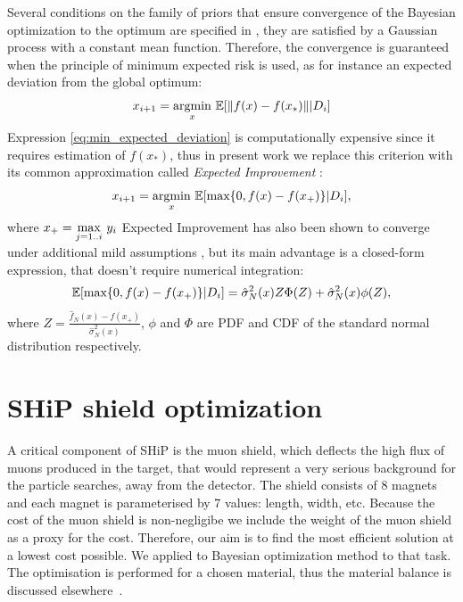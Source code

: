 \documentclass[a4paper]{jpconf}
\theoremstyle{my_theorem_style}
\numberwithin{equation}{section}
\begin{document}
Several conditions on the family of priors that ensure convergence of the Bayesian optimization to the optimum are specified in \cite{Mockus1994}, they are satisfied by a Gaussian process with a constant mean function. Therefore, the convergence is guaranteed when the principle of minimum expected risk is used, as for instance an expected deviation from the global optimum:
\begin{equation}
\label{eq:min_expected_deviation}
x_{i + 1} = \underset{x}{\textup{argmin}}\ \mathbb{E}[\|f(x) - f(x_*)\|  | D_i]
\end{equation}
Expression \ref{eq:min_expected_deviation} is computationally expensive since it requires estimation of $f(x_*)$, thus in present work we replace this criterion with its common approximation called \emph{Expected Improvement} \cite{Mockus1978}:
\begin{equation}
\label{EI}
x_{i + 1} = \underset{x}{\textup{argmin}}\ \mathbb{E}[\textup{max}\{0, f(x) - f(x_+)\}  | D_i],
\end{equation} 
where $x_+ = \underset{j = 1..i}{\textup{max}}\ y_i$
Expected Improvement has also been shown to converge under additional mild assumptions \cite{vazquez2010convergence}, but its main advantage is a closed-form expression, that doesn't require numerical integration:
\begin{equation}
\label{EI:closed_form}
\mathbb{E}[\textup{max}\{0, f(x) - f(x_+)\}  | D_i] = \hat{\sigma}_N^2(x) Z \Phi(Z) + \hat{\sigma}_N^2(x) \phi(Z),
\end{equation}
where $Z = \frac{\hat{f}_N(x) - f(x_+)}{\hat{\sigma}_N^2(x)}$, $\phi$ and $\Phi$ are PDF and CDF of the standard normal distribution respectively.


\section{SHiP shield optimization}

A critical component of SHiP is the muon shield, which deflects the high flux of muons produced in the target, that would represent a very serious  background for the particle searches, away from the detector. The shield consists of 8 magnets and each magnet is parameterised by 7 values: length, width, etc. Because the cost of the muon shield is non-negligibe we include the weight of the muon shield as a proxy for the cost. Therefore, our aim is to find the most efficient solution at a lowest cost possible. We applied to Bayesian optimization method to that task. The optimisation is performed for a chosen material, thus the material balance is discussed elsewhere~\cite{Akmete:2017bpl}.
\end{document}

